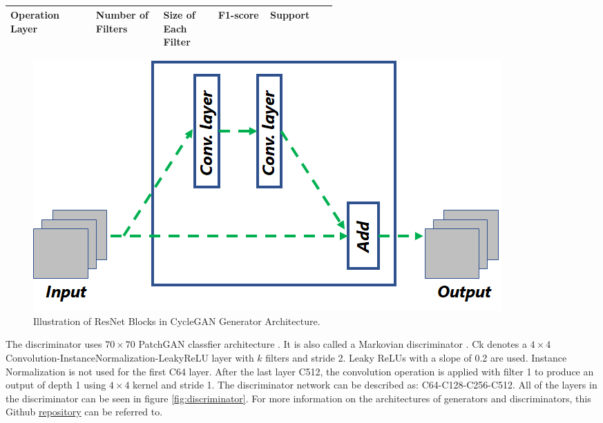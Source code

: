 \begin{center}
\begin{table}[H]
    \begin{center}
    \begin{tabular}{p{0.15\linewidth} p{0.10\linewidth} p{0.10\linewidth} p{0.10\linewidth} p{0.10\linewidth}} 
        \toprule
         Operation Layer & Number of Filters & Size of Each Filter & F1-score & Support\\[0.0ex] 
        \midrule
      
        \bottomrule
    \end{tabular}
    \caption[]{}
    \label{table:discriminatorArchitecture}
    \end{center}
\end{table}
\end{center}

\begin{figure}[H]
        \begin{center}
	    \includegraphics[scale=0.50]{images/resnetBlocks.png}
	    \caption[Illustration of ResNet Blocks in \ac{CycleGAN} Generator Architecture.]{Illustration of ResNet Blocks in \ac{CycleGAN} Generator Architecture.}
	    \label{fig:resnetBlock}
	    \end{center}
\end{figure}


The discriminator uses $70 \times 70$ PatchGAN classfier architecture \cite{isola2018imagetoimage}. It is also called a Markovian discriminator \cite{li2016precomputed}. {\selectfont Ck} denotes a $4 \times 4$ Convolution-InstanceNormalization-LeakyReLU layer with $k$ filters and stride 2. Leaky ReLUs with a slope of 0.2 are used. Instance Normalization is not used for the first {\selectfont C64} layer. After the last layer {\selectfont C512}, the convolution operation is applied with filter 1 to produce an output of depth 1 using $4 \times 4$ kernel and stride 1. The discriminator network can be described as: {\selectfont C64-C128-C256-C512}. All of the layers in the discriminator can be seen in figure \ref{fig:discriminator}. For more information on the architectures of generators and discriminators, this Github \href{https://github.com/jcjohnson/fast-neural-style}{repository} can be referred to.

